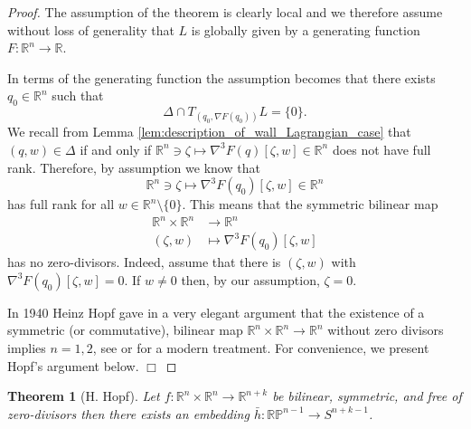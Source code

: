 \documentclass[12pt]{article}
\newtheorem{theorem}{Theorem}
\newcommand{\proofend}{$\Box$\bigskip}
\newcommand{\R}{{\mathbb R}}
\newcommand{\RP}{{\mathbb {RP}}}
\begin{document}
\begin{proof}
The assumption of the theorem is clearly local and we therefore assume without loss of generality that $L$ is globally given by a generating function $F:\R^n\to\R$.

In terms of the generating function the assumption becomes that there exists $q_0\in\R^n$ such that
\begin{equation}\nonumber
\Delta\cap T_{(q_0,\nabla F(q_0))}L=\{0\}.
\end{equation}
We recall from Lemma \ref{lem:description_of_wall_Lagrangian_case} that $(q,w)\in\Delta$ if and only if $\R^n\ni\zeta\mapsto \nabla^3F(q)[\zeta,w]\in\R^n$ does not have full rank. Therefore, by assumption we know that
\begin{equation}\nonumber
\R^n\ni\zeta\mapsto \nabla^3F(q_0)[\zeta,w]\in\R^n
\end{equation}
has full rank for all $w\in\R^n\setminus\{0\}$. This means that the symmetric bilinear map
\begin{equation}\nonumber
\begin{aligned}
\R^n\times\R^n&\to\R^n\\
(\zeta,w)&\mapsto\nabla^3F(q_0)[\zeta,w]
\end{aligned}
\end{equation}
has no zero-divisors. Indeed, assume that there is $(\zeta,w)$ with $\nabla^3F(q_0)[\zeta,w]=0$. If $w\neq0$ then, by our assumption, $\zeta=0$.

In 1940 Heinz Hopf gave in \cite{Hopf} a very elegant argument that the existence of a symmetric (or commutative), bilinear map $\R^n\times\R^n\to\R^n$ without zero divisors implies $n=1,2$, see \cite{Ja} or \cite{Ha} for a modern treatment. For convenience, we present Hopf's argument below. \proofend 
\end{proof}

\begin{theorem}[H. Hopf]
Let $f:\R^n\times\R^n\to\R^{n+k}$ be bilinear, symmetric, and free of zero-divisors then there exists an embedding $\bar h:\RP^{n-1}\to S^{n+k-1}$.
\end{theorem}
\end{document}
